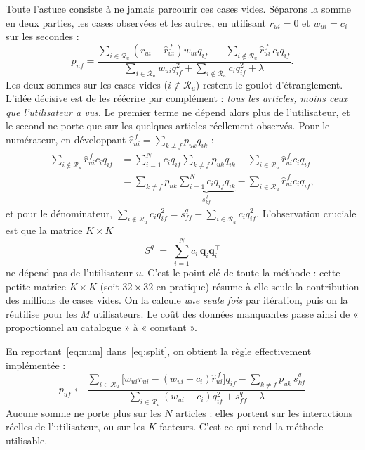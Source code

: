 \documentclass[11pt,a4paper]{article}
\begin{document}
Toute l'astuce consiste à ne jamais parcourir ces cases vides. Séparons la somme en deux
parties, les cases observées et les autres, en utilisant $r_{ui}=0$ et $w_{ui}=c_i$ sur
les secondes :
\begin{equation}\label{eq:split}
p_{uf}=\frac{\sum_{i\in\mathcal{R}_u}(r_{ui}-\hat r^{\,f}_{ui})w_{ui}q_{if}
             \;-\;\sum_{i\notin\mathcal{R}_u}\hat r^{\,f}_{ui}\,c_i q_{if}}
            {\sum_{i\in\mathcal{R}_u} w_{ui}q_{if}^2
             +\sum_{i\notin\mathcal{R}_u} c_i q_{if}^2+\lambda}.
\end{equation}
Les deux sommes sur les cases vides ($i\notin\mathcal{R}_u$) restent le goulot
d'étranglement. L'idée décisive est de les réécrire par complément : \emph{tous les
articles, moins ceux que l'utilisateur a vus}. Le premier terme ne dépend alors plus de
l'utilisateur, et le second ne porte que sur les quelques articles réellement observés.
Pour le numérateur, en développant $\hat r^{\,f}_{ui}=\sum_{k\neq f}p_{uk}q_{ik}$ :
\begin{align}
\sum_{i\notin\mathcal{R}_u}\hat r^{\,f}_{ui}c_iq_{if}
&=\sum_{i=1}^{N} c_iq_{if}\sum_{k\neq f}p_{uk}q_{ik}
 -\sum_{i\in\mathcal{R}_u}\hat r^{\,f}_{ui}c_iq_{if} \nonumber\\
&=\sum_{k\neq f}p_{uk}\underbrace{\sum_{i=1}^{N} c_i q_{if}q_{ik}}_{\textstyle s^q_{kf}}
 -\sum_{i\in\mathcal{R}_u}\hat r^{\,f}_{ui}c_iq_{if},
\label{eq:num}
\end{align}
et pour le dénominateur, $\sum_{i\notin\mathcal{R}_u}c_iq_{if}^2
= s^q_{ff}-\sum_{i\in\mathcal{R}_u}c_iq_{if}^2$. L'observation cruciale est que la
matrice $K\times K$
\begin{equation}\label{eq:sq}
S^q \;=\; \sum_{i=1}^{N} c_i\,\mathbf q_i\mathbf q_i^{\top}
\end{equation}
ne dépend pas de l'utilisateur $u$. C'est le point clé de toute la méthode : cette
petite matrice $K\times K$ (soit $32\times32$ en pratique) résume à elle seule la
contribution des millions de cases vides. On la calcule \emph{une seule fois} par
itération, puis on la réutilise pour les $M$ utilisateurs. Le coût des données
manquantes passe ainsi de « proportionnel au catalogue » à « constant ».

En reportant~\eqref{eq:num} dans~\eqref{eq:split}, on obtient la règle effectivement
implémentée :
\begin{equation}\label{eq:pu}
\boxed{\;p_{uf}\leftarrow
\frac{\displaystyle\sum_{i\in\mathcal{R}_u}\!\big[w_{ui}r_{ui}-(w_{ui}-c_i)\hat r^{\,f}_{ui}\big]q_{if}
-\sum_{k\neq f}p_{uk}\,s^q_{kf}}
{\displaystyle\sum_{i\in\mathcal{R}_u}(w_{ui}-c_i)q_{if}^2+s^q_{ff}+\lambda}\;}
\end{equation}
Aucune somme ne porte plus sur les $N$ articles : elles portent sur les interactions
réelles de l'utilisateur, ou sur les $K$ facteurs. C'est ce qui rend la méthode
utilisable.
\end{document}
